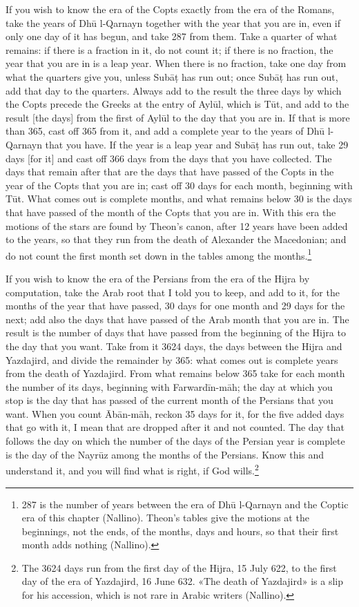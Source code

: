 \documentclass[11pt]{article}
\newcommand{\ArPage}[1]{\marginpar{\footnotesize\color{gray}Ar.\,p.\,#1}}
\begin{document}
\par If you wish to know the era of the Copts exactly from the era of the Romans, take the years of Dhū l-Qarnayn together with the year that you are in, even if only one day of it has begun, and take 287 from them. Take a quarter of what remains: if there is a fraction in it, do not count it; if there is no fraction, the year that you are in is a leap year. When there is no fraction, take one day from what the quarters give you, unless Subāṭ has run out; once Subāṭ has run out, add that day to the quarters. Always add to the result the three days by which the Copts precede the Greeks at the entry of Aylūl, which is Tūt, and add to the result [the days] from the first of Aylūl to the day that you are in. If that is more than 365, cast off 365 from it, and add a complete year to the years of Dhū l-Qarnayn that you have. If the year is a leap year and Subāṭ has run out, take 29 days [for it] and cast off 366 days from the days that you have collected. The days that remain after that are the days that have passed of the Copts in the year of the Copts that you are in; cast off 30 days for each month, beginning with Tūt. What comes out is complete months, and what remains below 30 is the days that have passed of the month of the Copts that you are in. With this era the motions of the stars are found by Theon's canon, after 12 years have been added to the years, so that they run from the death of Alexander the Macedonian; and do not count the first month set down in the tables among the months.\footnote{287 is the number of years between the era of Dhū l-Qarnayn and the Coptic era of this chapter (Nallino). Theon's tables give the motions at the beginnings, not the ends, of the months, days and hours, so that their first month adds nothing (Nallino).}\par
\par \ArPage{104}If you wish to know the era of the Persians from the era of the Hijra by computation, take the Arab root that I told you to keep, and add to it, for the months of the year that have passed, 30 days for one month and 29 days for the next; add also the days that have passed of the Arab month that you are in. The result is the number of days that have passed from the beginning of the Hijra to the day that you want. Take from it 3624 days, the days between the Hijra and Yazdajird, and divide the remainder by 365: what comes out is complete years from the death of Yazdajird. From what remains below 365 take for each month the number of its days, beginning with Farwardīn-māh; the day at which you stop is the day that has passed of the current month of the Persians that you want. When you count Ābān-māh, reckon 35 days for it, for the five added days that go with it, I mean that are dropped after it and not counted. The day that follows the day on which the number of the days of the Persian year is complete is the day of the Nayrūz among the months of the Persians. Know this and understand it, and you will find what is right, if God wills.\footnote{The 3624 days run from the first day of the Hijra, 15 July 622, to the first day of the era of Yazdajird, 16 June 632. «The death of Yazdajird» is a slip for his accession, which is not rare in Arabic writers (Nallino).}\par
\end{document}
